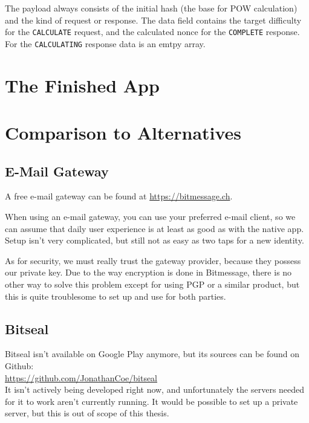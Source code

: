 \documentclass{bfh}
\begin{document}
  The payload always consists of the initial hash (the base for \ac{POW} calculation) and the kind of request or response. The data field contains the target difficulty for the \texttt{CALCULATE} request, and the calculated nonce for the \texttt{COMPLETE} response. For the \texttt{CALCULATING} response data is an emtpy array.


  \newpage
  \section{The Finished App}












  \newpage
  \section{Comparison to Alternatives}
  \subsection{E-Mail Gateway}
  A free e-mail gateway can be found at \url{https://bitmessage.ch}.

  When using an e-mail gateway, you can use your preferred e-mail client, so we can assume that daily user experience is at least as good as with the native app. Setup isn't very complicated, but still not as easy as two taps for a new identity.

  As for security, we must really trust the gateway provider, because they possess our private key. Due to the way encryption is done in Bitmessage, there is no other way to solve this problem except for using \ac{PGP} or a similar product, but this is quite troublesome to set up and use for both parties.


  \subsection{Bitseal}
  Bitseal isn't available on Google Play\texttrademark{} anymore, but its sources can be found on Github:\\
  \url{https://github.com/JonathanCoe/bitseal}\\
  It isn't actively being developed right now, and unfortunately the servers needed for it to work aren't currently running. It would be possible to set up a private server, but this is out of scope of this thesis.
\end{document}
